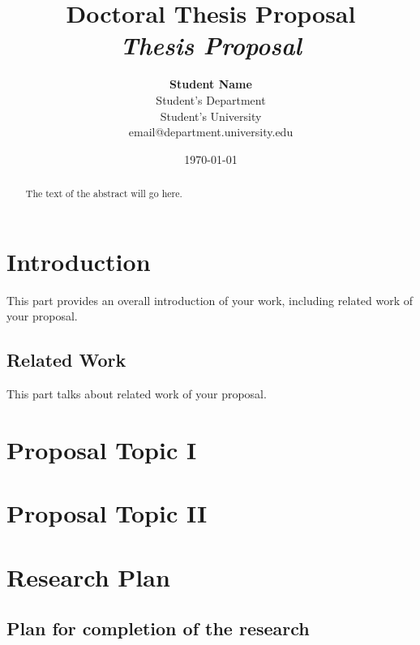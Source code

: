 \documentclass[12pt]{thesisproposal}
\title{{\bf Doctoral Thesis Proposal} \\	
\it Thesis Proposal}
\author{ {\bf Student Name} \\
Student's Department \\
Student's University \\
{\small email@department.university.edu}
}
\date{\today}
\begin{document}
\maketitle

\pagebreak

\pagestyle{plain}

\begin{abstract}
The text of the abstract will go here.
\end{abstract}

\pagebreak

\tableofcontents

\pagebreak

\cleardoublepage
{}

\section{Introduction}
\label{section:introduction}

This part provides an overall introduction of your work, including related work of your proposal.

\subsection{Related Work}
\label{subsection:related_work}

This part talks about related work of your proposal.

\section{Proposal Topic I}
\label{section:some_label}

\section{Proposal Topic II}
\label{section:some_other_label}

\section{Research Plan}
\label{section:plan}

\subsection{Plan for completion of the research}
\end{document}
